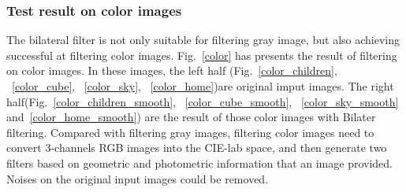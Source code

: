 \documentclass[12pt]{article}
\begin{document}
\subsubsection{Test result on color images}
The bilateral filter is not only suitable for filtering gray image, but also achieving successful at filtering color images.
Fig.~\ref{color} has presents the result of filtering on color images.
In these images, the left half (Fig.~\ref{color_children}, ~\ref{color_cube}, ~\ref{color_sky}, ~\ref{color_home})are original imput images.
The right half(Fig.~\ref{color_children_smooth}, ~\ref{color_cube_smooth}, ~\ref{color_sky_smooth} and~\ref{color_home_smooth}) are the result of those color images with Bilater filtering. 
Compared with filtering gray images, filtering color images need to convert 3-channels RGB images into the CIE-lab space, and then generate two filters based on geometric and photometric information that an image provided.
Noises on the original input images could be removed.
\end{document}
